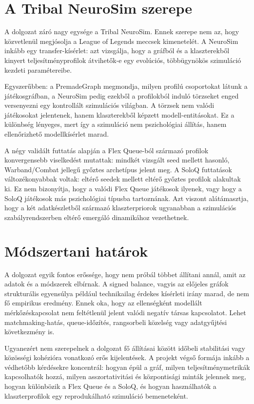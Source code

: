 \section{A Tribal NeuroSim szerepe}

A dolgozat záró nagy egysége a Tribal NeuroSim. Ennek szerepe nem az, hogy közvetlenül
megjósolja a League of Legends meccsek kimenetelét. A NeuroSim inkább egy transfer-kísérlet:
azt vizsgálja, hogy a gráfból és a klaszterekből kinyert teljesítményprofilok átvihetők-e egy
evolúciós, többügynökös szimuláció kezdeti paramétereibe.

Egyszerűbben: a PremadeGraph megmondja, milyen profilú csoportokat látunk a játékosgráfban,
a NeuroSim pedig ezekből a profilokból induló törzseket enged versenyezni egy kontrollált
szimulációs világban. A törzsek nem valódi játékosokat jelentenek, hanem klaszterekből képzett
modell-entitásokat. Ez a különbség lényeges, mert így a szimuláció nem pszichológiai állítás,
hanem ellenőrizhető modellkísérlet marad.

A négy validált futtatás alapján a Flex Queue-ból származó profilok konvergensebb viselkedést
mutattak: mindkét vizsgált seed mellett hasonló, Warband/Combat jellegű győztes archetípus jelent
meg. A SoloQ futtatások változékonyabbak voltak: eltérő seedek mellett eltérő győztes profilok
alakultak ki. Ez nem bizonyítja, hogy a valódi Flex Queue játékosok ilyenek, vagy hogy a SoloQ
játékosok más pszichológiai típusba tartoznának. Azt viszont alátámasztja, hogy a két adatkészletből
származó klaszterpriorok ugyanabban a szimulációs szabályrendszerben eltérő emergáló dinamikához
vezethetnek.

\section{Módszertani határok}

A dolgozat egyik fontos erőssége, hogy nem próbál többet állítani annál, amit az adatok és a
módszerek elbírnak. A signed balance, vagyis az előjeles gráfok strukturális egyensúlya például
technikailag érdekes kísérleti irány marad, de nem fő empirikus eredmény. Ennek oka, hogy az
ellenségként modellált mérkőzéskapcsolat nem feltétlenül jelent valódi negatív társas kapcsolatot.
Lehet matchmaking-hatás, queue-időzítés, rangsorbeli közelség vagy adatgyűjtési következmény is.

Ugyanezért nem szerepelnek a dolgozat fő állításai között időbeli stabilitási vagy közösségi
kohézióra vonatkozó erős kijelentések. A projekt végső formája inkább a védhetőbb kérdésekre
koncentrál: hogyan épül a gráf, milyen teljesítménymetrikák kapcsolhatók hozzá, milyen
asszortativitási és központisági minták jelennek meg, hogyan különbözik a Flex Queue és a SoloQ,
és hogyan használhatók a klaszterprofilok egy reprodukálható szimuláció bemeneteként.

